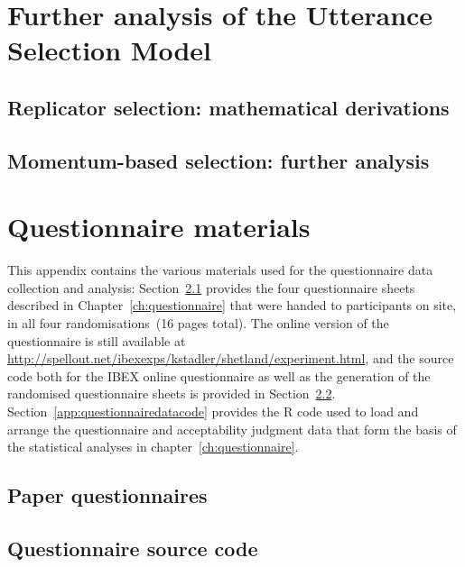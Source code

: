 \documentclass[oneside]{book}
\begin{document}
\chapter[Further analysis of the USM]{Further analysis of the Utterance Selection Model}
\label{app:math}

\section{Replicator selection: mathematical derivations}
%

\section{Momentum-based selection: further analysis}
%

\chapter{Questionnaire materials}
\label{app:questionnaire}
This appendix contains the various materials used for the questionnaire data collection and analysis: Section~\ref{app:paperquestionnaire} provides the four questionnaire sheets described in Chapter~\ref{ch:questionnaire} that were handed to participants on site, in all four randomisations~(16 pages total). The online version of the questionnaire is still available at \url{http://spellout.net/ibexexps/kstadler/shetland/experiment.html}, and the source code both for the IBEX online questionnaire as well as the generation of the randomised questionnaire sheets is provided in Section~\ref{app:questionnairecode}. Section~\ref{app:questionnairedatacode} provides the R code used to load and arrange the questionnaire and acceptability judgment data that form the basis of the statistical analyses in chapter~\ref{ch:questionnaire}.

\section{Paper questionnaires}
\label{app:paperquestionnaire}
%
%
\section{Questionnaire source code}
\label{app:questionnairecode}
\end{document}
